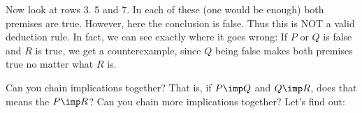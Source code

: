 \begin{questions}
\begin{solution}
\begin{parts}
      Now look at rows 3. 5 and 7.  In each of these (one would be enough) both premises are true.  However, here the conclusion is false.  Thus this is NOT a valid deduction rule.  In fact, we can see exactly where it goes wrong: If $P$ or $Q$ is false and $R$ is true, we get a counterexample, since $Q$ being false makes both premises true no matter what $R$ is.
  \end{parts}
\end{solution}


  \question[8] Can you chain implications together?  That is, if $P \imp Q$ and $Q \imp R$, does that means the $P \imp R$?  Can you chain more implications together?  Let's find out:
\end{questions}
